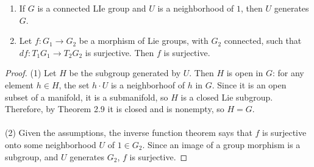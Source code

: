 \begin{corollary}
  \hfill
  \begin{enumerate}[label=\textnormal{(\arabic*)}]
  \item If $G$ is a connected LIe group and $U$ is a neighborhood of $1$,
    then $U$ generates $G$.
  \item Let $f\colon G_1\to G_2$ be a morphism of Lie groups, with $G_2$
    connected, such that $df\colon T_1G_1\to T_2G_2$ is surjective. Then
    $f$ is surjective.
  \end{enumerate}
\end{corollary}
\begin{proof}
(1) Let $H$ be the subgroup generated by $U$. Then $H$ is open in $G$: for
any element $h\in H$, the set $h\cdot U$ is a neighborhoof of $h$ in
$G$. Since it is an open subset of a manifold, it is a submanifold, so $H$
is a closed Lie subgroup. Therefore, by Theorem 2.9 it is closed and is
nonempty, so $H=G$.
\\\\
(2) Given the assumptions, the inverse function theorem says that $f$ is
surjective onto some neighborhood $U$ of $1\in G_2$. Since an image of
a group morphism is a subgroup, and $U$ generates $G_2$, $f$ is
surjective.
\end{proof}

